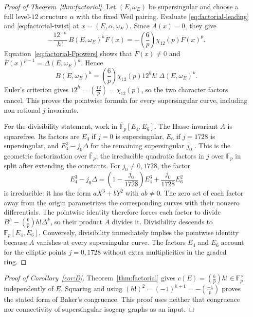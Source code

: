 \documentclass[11pt,a4paper]{article}
\numberwithin{equation}{section}
\theoremstyle{definition}
\theoremstyle{remark}
\newcommand{\Fp}{\mathbb F_p}
\newcommand{\Fb}{\overline{\mathbb F}_p}
\newcommand{\leg}[2]{\left(\frac{#1}{#2}\right)}
\newcommand{\Lp}[1]{\left(\frac{#1}{p}\right)}
\begin{document}
\begin{proof}[Proof of Theorem~\ref{thm:factorial}]
Let $(E,\omega_E)$ be supersingular and choose a full level-$12$
structure $\alpha$ with the fixed Weil pairing. Evaluate
\eqref{eq:factorial-leading} and \eqref{eq:factorial-twist} at
$x=(E,\alpha,\omega_E)$. Since $A(x)=0$, they give
\[
-\frac{12^{-h}}{h!}\,B(E,\omega_E)^h\overline F(x)
=-\Lp6\chi_{12}(p)\overline F(x)^p.
\]
Equation~\eqref{eq:factorial-Fpowers} shows that
$\overline F(x)\ne0$ and
$\overline F(x)^{p-1}=\Delta(E,\omega_E)^k$. Hence
\[
B(E,\omega_E)^h
=\Lp6\chi_{12}(p)12^h h!\,\Delta(E,\omega_E)^k.
\]
Euler's criterion gives $12^h=\leg{12}{p}=\chi_{12}(p)$,
so the two character factors cancel. This proves the pointwise formula
for every supersingular curve, including non-rational $j$-invariants.

For the divisibility statement, work in $\Fb[E_4,E_6]$.
The Hasse invariant $A$ is squarefree. Its factors are $E_4$ if
$j=0$ is supersingular, $E_6$ if $j=1728$ is supersingular, and
$E_4^3-j_0\Delta$ for the remaining supersingular $j_0$
\citep[\S3]{KZ98}. This is the geometric factorization over $\Fb$;
the irreducible quadratic factors in $j$ over $\Fp$ in
\citet[Theorem~1.2]{Baker98} split after extending the constants.
For $j_0\ne0,1728$, the factor
\[
E_4^3-j_0\Delta
=\left(1-\frac{j_0}{1728}\right)E_4^3
+\frac{j_0}{1728}E_6^2
\]
is irreducible: it has the form $aX^3+bY^2$ with $ab\ne0$.
The zero set of each factor away from the origin
parametrizes the corresponding curves with their nonzero differentials.
The pointwise identity therefore forces each factor to divide
$B^h-\Lp6h!\Delta^k$, so their product $A$ divides it.
Divisibility descends to $\Fp[E_4,E_6]$. Conversely, divisibility
immediately implies the pointwise identity because $A$ vanishes at every
supersingular curve. The factors $E_4$ and $E_6$ account for the elliptic
points $j=0,1728$ without extra multiplicities in the graded ring.
\end{proof}

\begin{proof}[Proof of Corollary~\ref{cor:D}]
Theorem~\ref{thm:factorial} gives $c(E)=\Lp6h!\in\Fp^\times$
independently of $E$. Squaring and using
$(h!)^2=(-1)^{h+1}=-\Lp{-1}$ proves the stated form of
Baker's congruence. This proof uses neither that congruence nor
connectivity of supersingular isogeny graphs as an input.
\end{proof}
\end{document}
